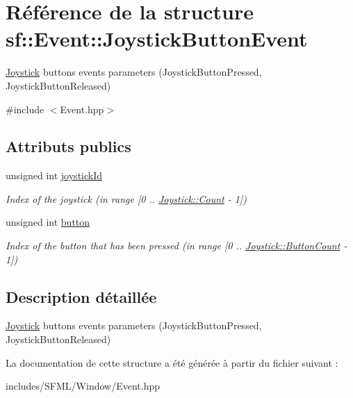 \hypertarget{structsf_1_1Event_1_1JoystickButtonEvent}{}\section{Référence de la structure sf\+:\+:Event\+:\+:Joystick\+Button\+Event}
\label{structsf_1_1Event_1_1JoystickButtonEvent}


\hyperlink{classsf_1_1Joystick}{Joystick} buttons events parameters (Joystick\+Button\+Pressed, Joystick\+Button\+Released)  




{\ttfamily \#include $<$Event.\+hpp$>$}

\subsection*{Attributs publics}
\begin{DoxyCompactItemize}
\item 
\mbox{\label{structsf_1_1Event_1_1JoystickButtonEvent_a2f80ecdb964a5ae0fc30726a404c41ec}} 
unsigned int \hyperlink{structsf_1_1Event_1_1JoystickButtonEvent_a2f80ecdb964a5ae0fc30726a404c41ec}{joystick\+Id}
\begin{DoxyCompactList}\small\item\em Index of the joystick (in range \mbox{[}0 .. \hyperlink{classsf_1_1Joystick_a951a7c775921304a5f3443c6e2bb4d65a6e0a2a95bc1da277610c04d80f52715e}{Joystick\+::\+Count} -\/ 1\mbox{]}) \end{DoxyCompactList}\item 
\mbox{\label{structsf_1_1Event_1_1JoystickButtonEvent_a6412e698a2f7904c5aa875a0d1b34da4}} 
unsigned int \hyperlink{structsf_1_1Event_1_1JoystickButtonEvent_a6412e698a2f7904c5aa875a0d1b34da4}{button}
\begin{DoxyCompactList}\small\item\em Index of the button that has been pressed (in range \mbox{[}0 .. \hyperlink{classsf_1_1Joystick_a951a7c775921304a5f3443c6e2bb4d65a2f1b8a0a59f2c12a4775c0e1e69e1816}{Joystick\+::\+Button\+Count} -\/ 1\mbox{]}) \end{DoxyCompactList}\end{DoxyCompactItemize}


\subsection{Description détaillée}
\hyperlink{classsf_1_1Joystick}{Joystick} buttons events parameters (Joystick\+Button\+Pressed, Joystick\+Button\+Released) 

La documentation de cette structure a été générée à partir du fichier suivant \+:\begin{DoxyCompactItemize}
\item 
includes/\+S\+F\+M\+L/\+Window/Event.\+hpp\end{DoxyCompactItemize}
